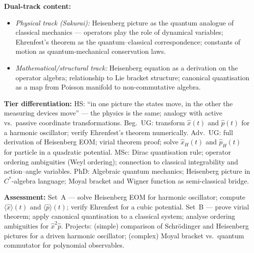 \documentclass[11pt,a4paper]{article}
\begin{document}
\begin{tcolorbox}[modulebox, title={Module~I.3 --- Lecture L07: Pictures of Quantum Mechanics and the Heisenberg Picture}]
\medskip\textbf{Dual-track content:}
\begin{itemize}[leftmargin=1.4em,topsep=2pt,itemsep=1pt]
  \item \textit{Physical track (Sakurai):} Heisenberg picture as the quantum analogue
    of classical mechanics --- operators play the role of dynamical variables;
    Ehrenfest's theorem as the quantum--classical correspondence;
    constants of motion as quantum-mechanical conservation laws.
  \item \textit{Mathematical/structural track:} Heisenberg equation as a derivation on the
    operator algebra; relationship to Lie bracket structure; canonical quantisation as
    a map from Poisson manifold to non-commutative algebra.
\end{itemize}

\medskip\textbf{Tier differentiation:}
HS: ``in one picture the states move, in the other the measuring devices move'' ---
the physics is the same; analogy with active vs.\ passive coordinate transformations.
Beg.\ UG: transform $\hat{x}(t)$ and $\hat{p}(t)$ for a harmonic oscillator;
verify Ehrenfest's theorem numerically.
Adv.\ UG: full derivation of Heisenberg EOM; virial theorem proof;
solve $\hat{x}_H(t)$ and $\hat{p}_H(t)$ for particle in a quadratic potential.
MSc: Dirac quantisation rule; operator ordering ambiguities (Weyl ordering);
connection to classical integrability and action--angle variables.
PhD: Algebraic quantum mechanics; Heisenberg picture in $C^*$-algebra language;
Moyal bracket and Wigner function as semi-classical bridge.

\medskip\textbf{Assessment:}
Set~A --- solve Heisenberg EOM for harmonic oscillator; compute $\langle\hat{x}\rangle(t)$
and $\langle\hat{p}\rangle(t)$; verify Ehrenfest for a cubic potential.
Set~B --- prove virial theorem; apply canonical quantisation to a classical system;
analyse ordering ambiguities for $\hat{x}^2\hat{p}$.
Projects: (simple) comparison of Schr\"odinger and Heisenberg pictures for a
driven harmonic oscillator; (complex) Moyal bracket vs.\ quantum commutator for
polynomial observables.
\end{tcolorbox}
\end{document}

